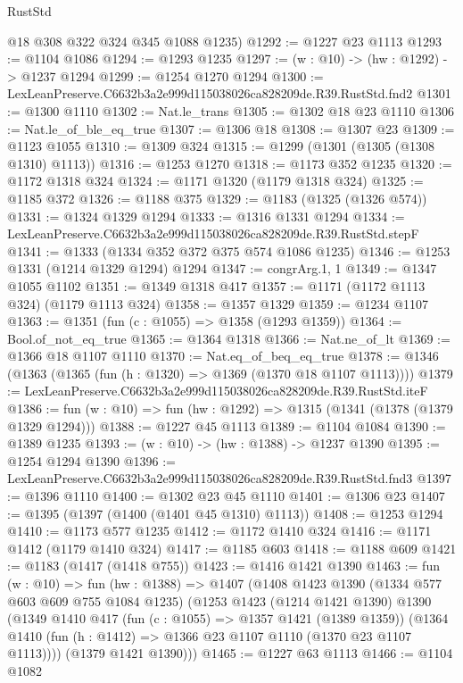 \begin{lexlean}{RustStd}
\begin{coremodule}
      @18
      @308
      @322
      @324
      @345
      @1088
      @1235)
@1292 := @1227 @23 @1113
@1293 := @1104 @1086
@1294 := @1293 @1235
@1297 := (w : @10) -> (hw : @1292) -> @1237 @1294
@1299 := @1254 @1270 @1294
@1300 := LexLeanPreserve.C6632b3a2e999d115038026ca828209de.R39.RustStd.fnd2
@1301 := @1300 @1110
@1302 := Nat.le_trans
@1305 := @1302 @18 @23 @1110
@1306 := Nat.le_of_ble_eq_true
@1307 := @1306 @18
@1308 := @1307 @23
@1309 := @1123 @1055
@1310 := @1309 @324
@1315 := @1299 (@1301 (@1305 (@1308 @1310) @1113))
@1316 := @1253 @1270
@1318 := @1173 @352 @1235
@1320 := @1172 @1318 @324
@1324 := @1171 @1320 (@1179 @1318 @324)
@1325 := @1185 @372
@1326 := @1188 @375
@1329 := @1183 (@1325 (@1326 @574))
@1331 := @1324 @1329 @1294
@1333 := @1316 @1331 @1294
@1334 := LexLeanPreserve.C6632b3a2e999d115038026ca828209de.R39.RustStd.stepF
@1341 := @1333 (@1334 @352 @372 @375 @574 @1086 @1235)
@1346 := @1253 @1331 (@1214 @1329 @1294) @1294
@1347 := congrArg.{1, 1}
@1349 := @1347 @1055 @1102
@1351 := @1349 @1318 @417
@1357 := @1171 (@1172 @1113 @324) (@1179 @1113 @324)
@1358 := @1357 @1329
@1359 := @1234 @1107
@1363 := @1351 (fun (c : @1055) => @1358 (@1293 @1359))
@1364 := Bool.of_not_eq_true
@1365 := @1364 @1318
@1366 := Nat.ne_of_lt
@1369 := @1366 @18 @1107 @1110
@1370 := Nat.eq_of_beq_eq_true
@1378 := @1346 (@1363 (@1365 (fun (h : @1320) => @1369 (@1370 @18 @1107 @1113))))
@1379 := LexLeanPreserve.C6632b3a2e999d115038026ca828209de.R39.RustStd.iteF
@1386 := fun (w : @10) => fun (hw : @1292) => @1315 (@1341 (@1378 (@1379 @1329 @1294)))
@1388 := @1227 @45 @1113
@1389 := @1104 @1084
@1390 := @1389 @1235
@1393 := (w : @10) -> (hw : @1388) -> @1237 @1390
@1395 := @1254 @1294 @1390
@1396 := LexLeanPreserve.C6632b3a2e999d115038026ca828209de.R39.RustStd.fnd3
@1397 := @1396 @1110
@1400 := @1302 @23 @45 @1110
@1401 := @1306 @23
@1407 := @1395 (@1397 (@1400 (@1401 @45 @1310) @1113))
@1408 := @1253 @1294
@1410 := @1173 @577 @1235
@1412 := @1172 @1410 @324
@1416 := @1171 @1412 (@1179 @1410 @324)
@1417 := @1185 @603
@1418 := @1188 @609
@1421 := @1183 (@1417 (@1418 @755))
@1423 := @1416 @1421 @1390
@1463 := fun (w : @10) =>
  fun (hw : @1388) =>
  @1407
    (@1408
      @1423
      @1390
      (@1334 @577 @603 @609 @755 @1084 @1235)
      (@1253
        @1423
        (@1214 @1421 @1390)
        @1390
        (@1349
          @1410
          @417
          (fun (c : @1055) => @1357 @1421 (@1389 @1359))
          (@1364 @1410 (fun (h : @1412) => @1366 @23 @1107 @1110 (@1370 @23 @1107 @1113))))
        (@1379 @1421 @1390)))
@1465 := @1227 @63 @1113
@1466 := @1104 @1082

\end{coremodule}
\end{lexlean}
